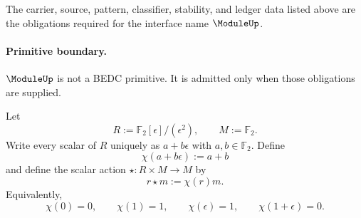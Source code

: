 \begin{definition}
\label{def:module-certificate-obligations}
The carrier, source, pattern, classifier, stability, and ledger data listed above are the obligations required for the interface name $\ModuleUp$.
\end{definition}

\paragraph{Primitive boundary.}
$\ModuleUp$ is not a BEDC primitive. It is admitted only when those obligations are supplied.

\begin{definition}
\label{def:dual-number-parity-action}
Let
$$
R:=\mathbb F_2[\epsilon]/(\epsilon^2),\qquad M:=\mathbb F_2.
$$
Write every scalar of $R$ uniquely as $a+b\epsilon$ with $a,b\in\mathbb F_2$. Define
$$
\chi(a+b\epsilon):=a+b
$$
and define the scalar action $\star:R\times M\to M$ by
$$
r\star m:=\chi(r)m.
$$
Equivalently,
$$
\chi(0)=0,\qquad \chi(1)=1,\qquad \chi(\epsilon)=1,
\qquad \chi(1+\epsilon)=0.
$$
\end{definition}


